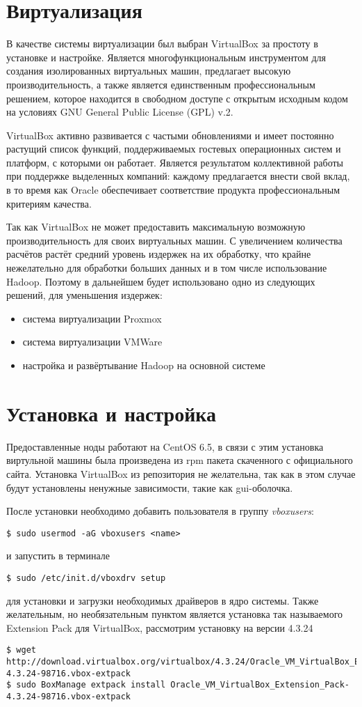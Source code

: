 \section{Виртуализация}
В качестве системы виртуализации был выбран VirtualBox за простоту в установке и настройке. Является 
многофункциональным инструментом для создания изолированных виртуальных машин, предлагает высокую 
производительность, а также является единственным профессиональным решением, которое находится в свободном 
доступе с открытым исходным кодом на условиях GNU General Public License (GPL) v.2.

VirtualBox активно развивается с частыми обновлениями и имеет постоянно растущий список функций, 
поддерживаемых гостевых операционных систем и платформ, с которыми он работает. Является результатом 
коллективной работы при поддержке выделенных компаний: каждому предлагается внести свой вклад, в то время 
как Oracle обеспечивает соответствие продукта профессиональным критериям качества. 

Так как VirtualBox не может предоставить максимальную возможную производительность для своих виртуальных 
машин. С увеличением количества расчётов растёт средний уровень издержек на их обработку, что крайне 
нежелательно для обработки больших данных и в том числе использование Hadoop. Поэтому в дальнейшем будет 
использовано одно из следующих решений, для уменьшения издержек:
\begin{itemize}
    \item система виртуализации Proxmox
    \item система виртуализации VMWare
    \item настройка и развёртывание Hadoop на основной системе
\end{itemize}

\section{Установка и настройка}
Предоставленные ноды работают на CentOS 6.5, в связи с этим установка виртульной машины была произведена из 
rpm пакета скаченного с официального сайта. Установка VirtualBox из репозитория не желательна, так как в 
этом случае будут установлены ненужные зависимости, такие как gui-оболочка.

\noindent После установки необходимо добавить пользователя в группу \emph{vboxusers}:
\begin{lstlisting}
$ sudo usermod -aG vboxusers <name>
\end{lstlisting}
и запустить в терминале
\begin{lstlisting}
$ sudo /etc/init.d/vboxdrv setup
\end{lstlisting}
для установки и загрузки необходимых драйверов в ядро системы. Также желательным, но необязательным пунктом 
является установка так называемого Extension Pack для VirtualBox, рассмотрим установку на версии 4.3.24
\begin{lstlisting}
$ wget http://download.virtualbox.org/virtualbox/4.3.24/Oracle_VM_VirtualBox_Extension_Pack-4.3.24-98716.vbox-extpack
$ sudo BoxManage extpack install Oracle_VM_VirtualBox_Extension_Pack-4.3.24-98716.vbox-extpack
\end{lstlisting}

